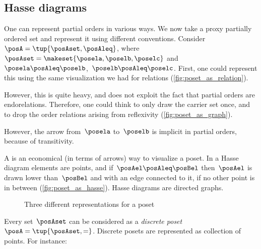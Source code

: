 \subsection{Hasse diagrams}
One can represent partial orders in various ways.
We now take a proxy partially ordered set and represent it using different conventions.
Consider~$\posA=\tup{\posAset,\posAleq}$, where~$\posAset=\makeset{\posela,\poselb,\poselc}$ and~$\posela\posAleq \poselb$,~$\poselb\posAleq \poselc$.
First, one could represent this using the same visualization we had for relations (\cref{fig:poset_as_relation}).

However, this is quite heavy, and does not exploit the fact that partial orders are endorelations.
Therefore, one could think to only draw the carrier set once, and to drop the order relations arising from reflexivity (\cref{fig:poset_as_graph}).

However, the arrow from~$\posela$ to~$\poselb$ is implicit in partial orders, because of transitivity.

A \emph{} is an economical (in terms of arrows) way to visualize a poset.
In a Hasse diagram elements are points, and if~$\posAel \posAleq \posBel$ then~$\posAel$ is drawn lower than~$\posBel$ and with an edge connected to it, if no other point is in between (\cref{fig:poset_as_hasse}).
Hasse diagrams are directed graphs.

\begin{figure*}[h]
    \hspace{4em}
    \hspace{4em}
    \hspace{4em}
    \caption{Three different representations for a poset}
    \label{fig:poset_representation}
\end{figure*}

\begin{example}
    \label{ex:discreteposet}
    Every set~$\posAset$ can be considered as a \emph{discrete poset}~$\posA = \tup{\posAset,=}$.
    Discrete posets are represented as collection of points.
    For instance:
\end{example}

